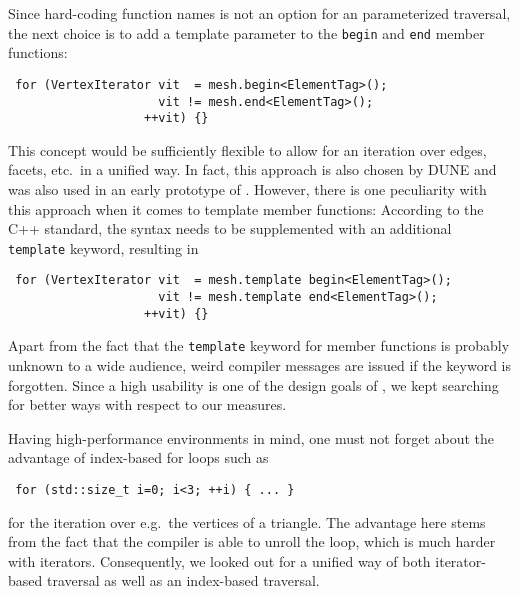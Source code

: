  Since hard-coding function names is not an option for an parameterized traversal,
 the next choice is to add a template parameter to the \lstinline|begin| and \lstinline|end| member functions:
 \begin{lstlisting}
 for (VertexIterator vit  = mesh.begin<ElementTag>();
                     vit != mesh.end<ElementTag>();
                   ++vit) {}
 \end{lstlisting}
 This concept would be sufficiently flexible to allow for an iteration over edges, facets, etc.~in a unified way.
 In fact, this approach is also chosen by DUNE \cite{DUNE} and was also used in an early prototype of {\ViennaGrid}.
 However, there is one peculiarity with this approach when it comes to template member functions: According to the C++ standard, the syntax needs to be supplemented with an additional \lstinline|template| keyword, resulting in
 \begin{lstlisting}
 for (VertexIterator vit  = mesh.template begin<ElementTag>();
                     vit != mesh.template end<ElementTag>();
                   ++vit) {}
 \end{lstlisting}
 Apart from the fact that the \lstinline|template| keyword for member functions is probably unknown to a wide audience,
 weird compiler messages are issued if the keyword is forgotten. Since a high usability is one of the design goals of {\ViennaGrid},
 we kept searching for better ways with respect to our measures.

 Having high-performance environments in mind, one must not forget about the advantage of index-based for loops such as
 \begin{lstlisting}
 for (std::size_t i=0; i<3; ++i) { ... }
 \end{lstlisting}
 for the iteration over e.g.~the vertices of a triangle.
 The advantage here stems from the fact that the compiler is able to unroll the loop, which is much harder with iterators.
 Consequently, we looked out for a unified way of both iterator-based traversal as well as an index-based traversal.

